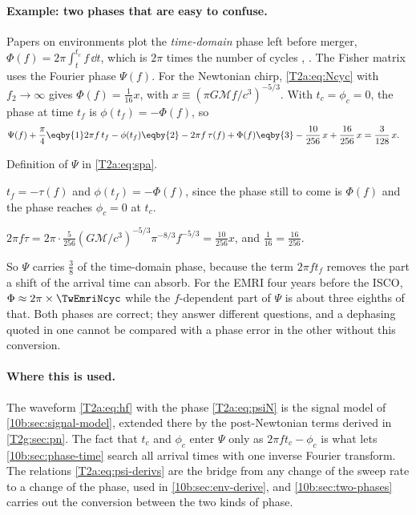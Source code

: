 \paragraph{Example: two phases that are easy to confuse.}
Papers on environments plot the \emph{time-domain} phase left before merger, $\Phi(f)=2\pi\int_t^{t_c}f\,\dd t$, which is $2\pi$ times the number of cycles \cite{Coogan2022}, \cite[eq.~(48)]{Kim2023}. The Fisher matrix uses the Fourier phase $\Psi(f)$. For the Newtonian chirp, \eqref{T2a:eq:Ncyc} with $f_2\to\infty$ gives $\Phi(f)=\tfrac1{16}x$, with $x\equiv(\pi G\mathcal Mf/c^3)^{-5/3}$. With $t_c=\phi_c=0$, the phase at time $t_f$ is $\phi(t_f)=-\Phi(f)$, so
\begin{align*}
  \Psi(f)+\frac\pi4
  &\eqby{1}2\pi f\,t_f-\phi(t_f)
  \eqby{2}-2\pi f\,\tau(f)+\Phi(f)
  \eqby{3}-\frac{10}{256}\,x+\frac{16}{256}\,x
  =\frac{3}{128}\,x .
\end{align*}
\begin{explain}
  \item Definition of $\Psi$ in \eqref{T2a:eq:spa}.
  \item $t_f=-\tau(f)$ and $\phi(t_f)=-\Phi(f)$, since the phase still to come is $\Phi(f)$ and the phase reaches $\phi_c=0$ at $t_c$.
  \item $2\pi f\tau=2\pi\cdot\tfrac5{256}(G\mathcal M/c^3)^{-5/3}\pi^{-8/3}f^{-5/3}=\tfrac{10}{256}x$, and $\tfrac1{16}=\tfrac{16}{256}$.
\end{explain}
So $\Psi$ carries $\tfrac38$ of the time-domain phase, because the term $2\pi f t_f$ removes the part a shift of the arrival time can absorb. For the EMRI four years before the ISCO, $\Phi\approx2\pi\times\TwEmriNcyc$ while the $f$-dependent part of $\Psi$ is about three eighths of that. Both phases are correct; they answer different questions, and a dephasing quoted in one cannot be compared with a phase error in the other without this conversion.

\paragraph{Where this is used.}
The waveform \eqref{T2a:eq:hf} with the phase \eqref{T2a:eq:psiN} is the signal model of \cref{10b:sec:signal-model}, extended there by the post-Newtonian terms derived in \cref{T2g:sec:pn}. The fact that $t_c$ and $\phi_c$ enter $\Psi$ only as $2\pi ft_c-\phi_c$ is what lets \cref{10b:sec:phase-time} search all arrival times with one inverse Fourier transform. The relations \eqref{T2a:eq:psi-derivs} are the bridge from any change of the sweep rate to a change of the phase, used in \cref{10b:sec:env-derive}, and \cref{10b:sec:two-phases} carries out the conversion between the two kinds of phase.
